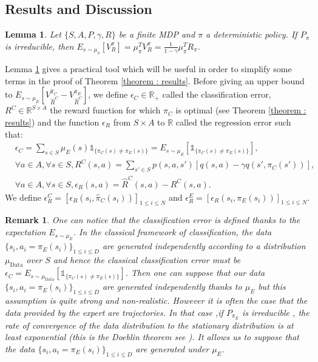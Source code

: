 \documentclass[11pt]{article}
\newtheorem{lemma}{Lemma}
\newtheorem{remark}{Remark}
\newcommand{\0}{\mathbf{0}}
\newcommand{\1}{\mathbf{1}}
\begin{document}
\subsection{Results and Discussion}
\begin{lemma}
\label{lemma: calculs V}
Let $\{S,A,P,\gamma,R\}$ be a finite MDP and $\pi$ a deterministic policy.
If $P_\pi$ is irreducible, then $E_{s\sim\mu_\pi}[V^\pi_R]=\mu_\pi^TV^\pi_R=\frac{1}{1-\gamma}\mu_\pi^TR_\pi$.
\end{lemma}
Lemma \ref{lemma: calculs V} gives a practical tool which will be useful in order to simplify some terms in the proof of Theorem \ref{theorem : results}.
Before giving an upper bound to $E_{s\sim\mu_E}[V^{\hat{\pi}_C}_{\hat{R}^C}-V^{\pi_E}_{\hat{R}^C}]$, we define $\epsilon_C\in\mathbb{R}_+$ called the classification error, $R^C\in \mathbb{R}^{S\times A}$ the reward function for which $\pi_C$ is optimal (see Theorem \ref{theorem : results}) and the function $\epsilon_R$ from $S\times A$ to $\mathbb{R}$ called the regression error such that:
\begin{align}
&\epsilon_C=\sum_{s\in S}\mu_{E}(s)\mathds{1}_{\{\pi_C(s)\neq\pi_E(s)\}}=E_{s \sim \mu_E}[\mathds{1}_{\{\pi_C(s)\neq\pi_E(s)\}}],
\\
&\forall a\in A, \forall s\in S,R^C(s,a)=\sum_{s'\in S}p(s,a,s')[q(s,a)-\gamma q(s',\pi_C(s'))],\label{RC.eq}\\
&\forall a\in A, \forall s\in S, \epsilon_R(s,a)=\hat{R}^C(s,a)-R^C(s,a).
\end{align}
We define $\epsilon^C_R=[\epsilon_R(s_i,\hat{\pi}_C(s_i))]_{1\leq i \leq N}$ and $\epsilon^E_R=[\epsilon_R(s_i,\pi_E(s_i))]_{1\leq i \leq N}$.
\begin{remark}
One can notice that the classification error is defined thanks to the expectation $E_{s \sim \mu_E}$. In the classical framework of classification, the data $\{s_i,a_i=\pi_E(s_i)\}_{1\leq i \leq D}$ are generated independently according to a distribution $\mu_{\text{Data}}$ over $S$ and hence the classical classification error must be $\epsilon_C=E_{s \sim \mu_{\text{Data}}}[\mathds{1}_{\{\pi_C(s)\neq\pi_E(s)\}}]$.
Then one can suppose that our data $\{s_i,a_i=\pi_E(s_i)\}_{1\leq i \leq D}$ are generated independently thanks to $\mu_E$ but this assumption is quite strong and non-realistic.
However it is often the case that the data provided by the expert are trajectories. In that case ,if $P_{\pi_E}$ is irreducible , the rate of convergence of the data distribution
to the stationary distribution is at least exponential (this is the Doeblin theorem see \cite{stroock2005introduction}). It allows us to suppose that the data $\{s_i,a_i=\pi_E(s_i)\}_{1\leq i \leq D}$ are generated under $\mu_E$.
\end{remark}
\end{document}
